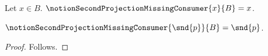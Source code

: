 

\begin{definition}\label{notion_second_projection_missing_consumer}
    Let $x\in B$.
    $\notionSecondProjectionMissingConsumer{x}{B}=x$.
\end{definition}

\begin{proposition}\label{notion_second_projection_missing}
    $\notionSecondProjectionMissingConsumer{\snd{p}}{B}=\snd{p}$.
\end{proposition}
\begin{proof}
    Follows.
\end{proof}
